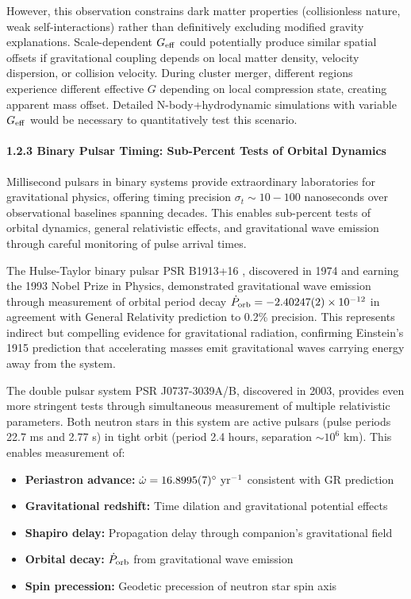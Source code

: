 \documentclass[10pt,a4paper]{article}
\providecommand{\tightlist}{\setlength{\itemsep}{0pt}\setlength{\parskip}{0pt}}
\begin{document}
However, this observation constrains dark matter properties
(collisionless nature, weak self-interactions) rather than definitively
excluding modified gravity explanations. Scale-dependent \(G_{\rm eff}\)
could potentially produce similar spatial offsets if gravitational
coupling depends on local matter density, velocity dispersion, or
collision velocity. During cluster merger, different regions experience
different effective \(G\) depending on local compression state, creating
apparent mass offset. Detailed N-body+hydrodynamic simulations with
variable \(G_{\rm eff}\) would be necessary to quantitatively test this
scenario.

\paragraph{1.2.3 Binary Pulsar Timing: Sub-Percent Tests of Orbital
Dynamics}\label{binary-pulsar-timing-sub-percent-tests-of-orbital-dynamics}

Millisecond pulsars in binary systems provide extraordinary laboratories
for gravitational physics, offering timing precision
\(\sigma_t \sim 10-100\) nanoseconds over observational baselines
spanning decades. This enables sub-percent tests of orbital dynamics,
general relativistic effects, and gravitational wave emission through
careful monitoring of pulse arrival times.

The Hulse-Taylor binary \cite{Hulse1975} pulsar PSR B1913+16 \cite{Taylor1979}, discovered in 1974 and
earning the 1993 Nobel Prize in Physics, demonstrated gravitational wave
emission through measurement of orbital period decay
\(\dot{P}_{\rm orb} = -2.40247(2) \times 10^{-12}\) in agreement with
General Relativity prediction to 0.2\% precision. This represents
indirect but compelling evidence for gravitational radiation, confirming
Einstein's 1915 prediction that accelerating masses emit gravitational
waves carrying energy away from the system.

The double pulsar system PSR J0737-3039A/B, discovered in 2003, provides
even more stringent tests through simultaneous measurement of multiple
relativistic parameters. Both neutron stars in this system are active
pulsars (pulse periods 22.7 ms and 2.77 s) in tight orbit (period 2.4
hours, separation \(\sim 10^6\) km). This enables measurement of:

\begin{itemize}
\tightlist
\item
  \textbf{Periastron advance:}
  \(\dot{\omega} = 16.8995(7)^\circ~{\rm yr^{-1}}\) consistent with GR
  prediction
\item
  \textbf{Gravitational redshift:} Time dilation and gravitational
  potential effects
\item
  \textbf{Shapiro delay:} Propagation delay through companion's
  gravitational field
\item
  \textbf{Orbital decay:} \(\dot{P}_{\rm orb}\) from gravitational wave
  emission
\item
  \textbf{Spin precession:} Geodetic precession of neutron star spin
  axis
\end{itemize}
\end{document}
